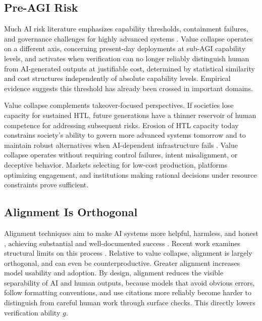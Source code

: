 \documentclass{article}
\theoremstyle{plain}
\theoremstyle{definition}
\theoremstyle{remark}
\begin{document}
\vspace{2pt}

\subsection{Pre-AGI Risk}
\label{sec:agi}

Much AI risk literature emphasizes capability thresholds, containment failures, and governance challenges for highly advanced systems \citep{Bostrom2014-BOSS, Tegmark2017-TEGLBW, russell2019human, hendrycks2025definitionagi, slattery2025airiskrepositorycomprehensive, doi:10.1126/science.adn0117}. Value collapse operates on a different axis, concerning present-day deployments at sub-AGI capability levels, and activates when verification can no longer reliably distinguish human from AI-generated outputs at justifiable cost, determined by statistical similarity and cost structures independently of absolute capability levels. Empirical evidence suggests this threshold has already been crossed in important domains.

Value collapse complements takeover-focused perspectives. If societies lose capacity for sustained HTL, future generations have a thinner reservoir of human competence for addressing subsequent risks. Erosion of HTL capacity today constrains society's ability to govern more advanced systems tomorrow and to maintain robust alternatives when AI-dependent infrastructure fails \citep{kulveit2025gradualdisempowermentsystemicexistential}. Value collapse operates without requiring control failures, intent misalignment, or deceptive behavior. Markets selecting for low-cost production, platforms optimizing engagement, and institutions making rational decisions under resource constraints prove sufficient.

\vspace{2pt}

\subsection{Alignment Is Orthogonal}
\label{sec:alignment}

Alignment techniques aim to make AI systems more helpful, harmless, and honest \citep{ziegler2020finetuninglanguagemodelshuman, NEURIPS2022_b1efde53, bai2022traininghelpfulharmlessassistant, bai2022constitutionalaiharmlessnessai, openai2024gpt4technicalreport}, achieving substantial and well-documented success \citep{openai2024gpt4ocard, openai2024openaio1card, perez-etal-2023-discovering, sharma2024towards}. Recent work examines structural limits on this process \citep{cao2025alignmentbottleneck}. Relative to value collapse, alignment is largely orthogonal, and can even be counterproductive. Greater alignment increases model usability and adoption. By design, alignment reduces the visible separability of AI and human outputs, because models that avoid obvious errors, follow formatting conventions, and use citations more reliably become harder to distinguish from careful human work through surface checks. This directly lowers verification ability $g$.
\end{document}
